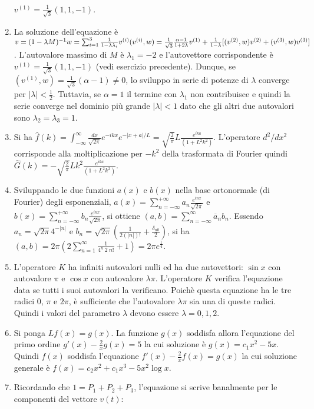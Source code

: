 \documentclass[a4paper,10pt]{article}
\begin{document}
\begin{enumerate}
$v^{(1)} = \frac{1}{\sqrt{3}} (1,1,-1)$.
\item La soluzione dell'equazione \`e $v=(1-\lambda M)^{-1} w=
\sum_{i=1}^3 \frac{1}{1-\lambda \lambda_i} v^{(i)} (v^{(i)},w) = \frac{1}{\sqrt{3}} \frac{\alpha -1}{1+2\lambda} v^{(1)} \\
+ \frac{1}{1-\lambda} [(v^{(2)},w) v^{(2)} + (v^{(3)},w) v^{(3)}]$.
L'autovalore massimo di $M$ \`e $\lambda_1 = -2$ e l'autovettore
corrispondente \`e $v^{(1)}=\frac{1}{\sqrt{3}} (1,1,-1)$ (vedi esercizio
precedente). Dunque, se $(v^{(1)},w) = \frac{1}{\sqrt{3}} (\alpha -1 ) \neq 0$, 
lo sviluppo in serie di potenze di $\lambda$ converge 
per $|\lambda|<\frac{1}{2}$. Tuttavia, se $\alpha=1$ il termine con 
$\lambda_1$ non contribuisce e quindi la serie converge 
nel dominio pi\`u grande $|\lambda|<1$ dato che gli altri due autovalori sono
$\lambda_2=\lambda_3=1$.
\item Si ha $\hat{f}(k)=\int_{-\infty}^\infty \frac{dx}{\sqrt{2\pi}}
e^{-ikx} e^{-|x+a|/L} = \sqrt{\frac{2}{\pi}} L \frac{e^{ika}}{(1+L^2k^2)}$. L'operatore
$d^2/dx^2$ corrisponde alla moltiplicazione per  $-k^2$ della trasformata di Fourier
quindi $\hat{G}(k) = - \sqrt{\frac{2}{\pi}} Lk^2 \frac{e^{ika}}{(1+L^2k^2)}$.
\item Sviluppando le due funzioni $a(x)$ e $b(x)$ nella base ortonormale (di Fourier) degli esponenziali,
$a(x) = \sum_{n=-\infty}^{+\infty} a_n \frac{e^{inx}}{\sqrt{2\pi}}$ e $b(x) = \sum_{n=-\infty}^{+\infty} b_n \frac{e^{inx}}{\sqrt{2\pi}}$, si ottiene
$(a,b)=\sum_{n=-\infty}^\infty \overline{a}_n b_n$.
Essendo  $a_n = \sqrt{2\pi} 4^{-|n|}$ e $b_n =\sqrt{2\pi}( \frac{1}{2 (|n|)!} + \frac{\delta_{n0}}{2})$,
si ha $(a,b) = 2\pi(2 \sum_{n=1}^\infty \frac{1}{4^n \ 2 \ n!} + 1) =
2\pi e^\frac14$.
\item L'operatore $K$ ha infiniti autovalori nulli ed ha due autovettori: 
$\sin x$ con autovalore $\pi$ e $\cos x$ con autovalore $\lambda \pi$.
L'operatore $K$ verifica l'equazione data se tutti i suoi autovalori la
verificano. Poich\`e questa equazione ha le tre radici $0$, $\pi$ e $2\pi$, 
\`e sufficiente che l'autovalore $\lambda \pi$ sia una di queste radici. Quindi i valori del parametro $\lambda$ devono essere $\lambda = 0, 1, 2$.
\item Si ponga $Lf(x)=g(x)$. La funzione $g(x)$ soddisfa allora l'equazione del primo ordine $g'(x)-\frac{2}{x} g(x)=5$ la cui soluzione \`e $g(x)=c_1 x^2-5x$. Quindi $f(x)$ soddisfa l'equazione $f'(x)-\frac{2}{x} f(x)=g(x)$ la cui soluzione generale \`e $f(x)= c_2x^2 + c_1x^3-5x^2\log x$.
\item Ricordando che $1=P_1+P_2+P_3$, l'equazione si scrive banalmente per le componenti del vettore $v(t)$: 

\end{enumerate}
\end{document}
